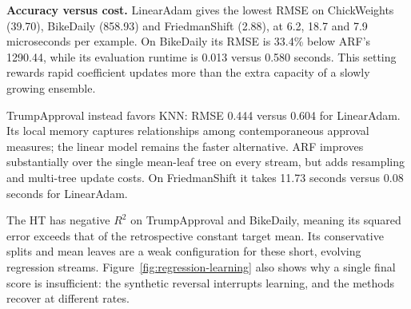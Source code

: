 \textbf{Accuracy versus cost.} LinearAdam gives the lowest RMSE on ChickWeights (39.70), BikeDaily (858.93) and FriedmanShift (2.88), at 6.2, 18.7 and 7.9 microseconds per example. On BikeDaily its RMSE is 33.4\% below ARF's 1290.44, while its evaluation runtime is 0.013 versus 0.580 seconds. This setting rewards rapid coefficient updates more than the extra capacity of a slowly growing ensemble.

TrumpApproval instead favors KNN: RMSE 0.444 versus 0.604 for LinearAdam. Its local memory captures relationships among contemporaneous approval measures; the linear model remains the faster alternative. ARF improves substantially over the single mean-leaf tree on every stream, but adds resampling and multi-tree update costs. On FriedmanShift it takes 11.73 seconds versus 0.08 seconds for LinearAdam.

The HT has negative $R^2$ on TrumpApproval and BikeDaily, meaning its squared error exceeds that of the retrospective constant target mean. Its conservative splits and mean leaves are a weak configuration for these short, evolving regression streams. Figure~\ref{fig:regression-learning} also shows why a single final score is insufficient: the synthetic reversal interrupts learning, and the methods recover at different rates.
